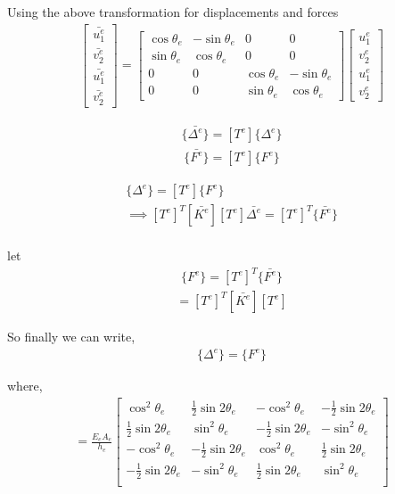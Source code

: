 Using the above transformation for displacements and forces
\begin{eqnarray}
\begin{bmatrix}
	\bar{u_1^e} \\
	\bar{v_2^e} \\
	\bar{u_1^e} \\
	\bar{v_2^e}
\end{bmatrix} =
\begin{bmatrix}
		\cos{\theta_e} & -\sin{\theta_e} & 0 & 0\\
		\sin{\theta_e} & \cos{\theta_e} & 0 & 0\\
		0 &  0 &\cos{\theta_e} & -\sin{\theta_e} \\
		0& 0& \sin{\theta_e} & \cos{\theta_e}  
\end{bmatrix}
\begin{bmatrix}
{u_1^e} \\
{v_2^e} \\
{u_1^e} \\
{v_2^e}
\end{bmatrix}
\end{eqnarray}

\begin{eqnarray}	
\{\bar{\Delta^e}\} = [T^e]  \{\Delta^e\}
\end{eqnarray}
\begin{eqnarray}	
\{\bar{F^e}\} = [T^e]  \{F^e\}
\end{eqnarray}

\begin{eqnarray}	
	[\bar{K^e}][T^e]  \{\Delta^e\} = [T^e]  \{F^e\}\\
	\implies [T^e]^T [\bar{K^e}] [T^e] {\bar{\Delta^e}} =  [T^e]^T \{\bar{F^e}\}\\
\end{eqnarray}

let 
\begin{eqnarray}
	\{ F^e \}=[T^e]^T \{ \bar{F^e} \}
\end{eqnarray}
\begin{eqnarray}
	[K^e] =  [T^e]^T [\bar{K^e}] [T^e]
\end{eqnarray}

So finally we can write,
\begin{eqnarray}	
	[{K^e}]\{{\Delta^e}\} = \{{F^e}\}
\end{eqnarray}

where,
\begin{eqnarray}
[K^e] = \frac{E_e A_e}{h_e}
	\begin{bmatrix}
		\cos^2{\theta_e} & \frac{1}{2}\sin{2\theta_e} & -\cos^2{\theta_e} & -\frac{1}{2}\sin{2\theta_e}\\
		\frac{1}{2}\sin{2\theta_e} & \sin^2{\theta_e} & -\frac{1}{2}\sin{2\theta_e} & -\sin^2{\theta_e}\\
			-\cos^2{\theta_e} & -\frac{1}{2}\sin{2\theta_e} & \cos^2{\theta_e} & \frac{1}{2}\sin{2\theta_e}\\
		-\frac{1}{2}\sin{2\theta_e} & -\sin^2{\theta_e} & \frac{1}{2}\sin{2\theta_e} & \sin^2{\theta_e}\\
	\end{bmatrix}
\end{eqnarray}
\pagebreak

